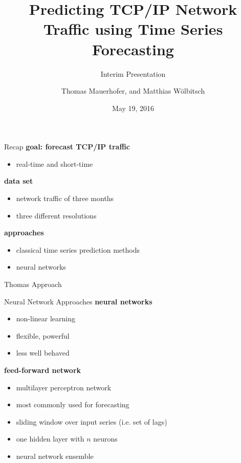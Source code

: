 \documentclass{beamer}
\title{Predicting TCP/IP Network Traffic using Time Series Forecasting}
\subtitle{Interim Presentation}
\date{May 19, 2016}
\author{Thomas Mauerhofer, and Matthias Wölbitsch}
\begin{document}
  \maketitle
  
  \begin{frame}{Recap}   
    \textbf{goal: forecast TCP/IP traffic}
    \begin{itemize}
     \item real-time and short-time
    \end{itemize}
    
    \textbf{data set}
    \begin{itemize}
     \item network traffic of three months
     \item three different resolutions
    \end{itemize}
    
    \textbf{approaches}
    \begin{itemize}
     \item classical time series prediction methods
     \item neural networks
    \end{itemize}
  \end{frame}
 
 
  \begin{frame}{Thomas Approach}
   
  \end{frame}

  
  \begin{frame}{Neural Network Approaches}
    \textbf{neural networks}
    \begin{itemize}
     \item non-linear learning
     \item flexible, powerful
     \item less well behaved
    \end{itemize}
    
    \textbf{feed-forward network}
    \begin{itemize}
     \item multilayer perceptron network
     \item most commonly used for forecasting
     \item sliding window over input series (i.e. set of lags)
     \item one hidden layer with \(n\) neurons
     \item neural network ensemble
    \end{itemize}
  \end{frame}
\end{document}
